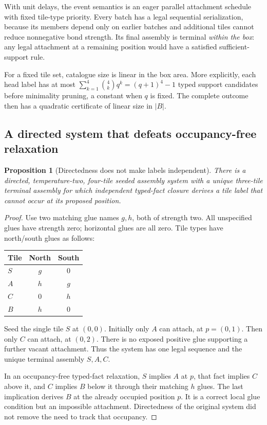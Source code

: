 \documentclass[11pt,letterpaper]{article}
\newtheorem{proposition}[theorem]{Proposition}
\theoremstyle{definition}
\theoremstyle{remark}
\begin{document}
With unit delays, the event semantics is an eager parallel attachment
schedule with fixed tile-type priority. Every batch has a legal sequential
serialization, because its members depend only on earlier batches and
additional tiles cannot reduce nonnegative bond strength. Its final
assembly is terminal \emph{within the box}: any legal attachment at a
remaining position would have a satisfied sufficient-support rule.

For a fixed tile set, catalogue size is linear in the box area. More
explicitly, each head label has at most
$\sum_{k=1}^4\binom4kq^k=(q+1)^4-1$ typed support candidates before
minimality pruning, a constant when $q$ is fixed. The complete outcome
then has a quadratic certificate of linear size in $|B|$.

\subsection{A directed system that defeats occupancy-free relaxation}
\begin{proposition}[Directedness does not make labels independent]\label{qoc:ts:prop:locking}
There is a directed, temperature-two, four-tile seeded assembly system with
a unique three-tile terminal assembly for which independent typed-fact
closure derives a tile label that cannot occur at its proposed position.
\end{proposition}
\begin{proof}
Use two matching glue names $g,h$, both of strength two. All unspecified
glues have strength zero; horizontal glues are all zero. Tile types have
north/south glues as follows:
\begin{center}
\begin{tabular}{lcc}
\toprule
Tile & North & South\\\midrule
$S$ & $g$ & $0$\\
$A$ & $h$ & $g$\\
$C$ & $0$ & $h$\\
$B$ & $h$ & $0$\\\bottomrule
\end{tabular}
\end{center}
Seed the single tile $S$ at $(0,0)$. Initially only $A$ can attach, at
$p=(0,1)$. Then only $C$ can attach, at $(0,2)$. There is no exposed
positive glue supporting a further vacant attachment. Thus the system
has one legal sequence and the unique terminal assembly $S,A,C$.

In an occupancy-free typed-fact relaxation, $S$ implies $A$ at $p$,
that fact implies $C$ above it, and $C$ implies $B$ below it through their
matching $h$ glues. The last implication derives $B$ at the already
occupied position $p$. It is a correct local glue condition but an
impossible attachment. Directedness of the original system did not remove
the need to track that occupancy.
\end{proof}
\end{document}
